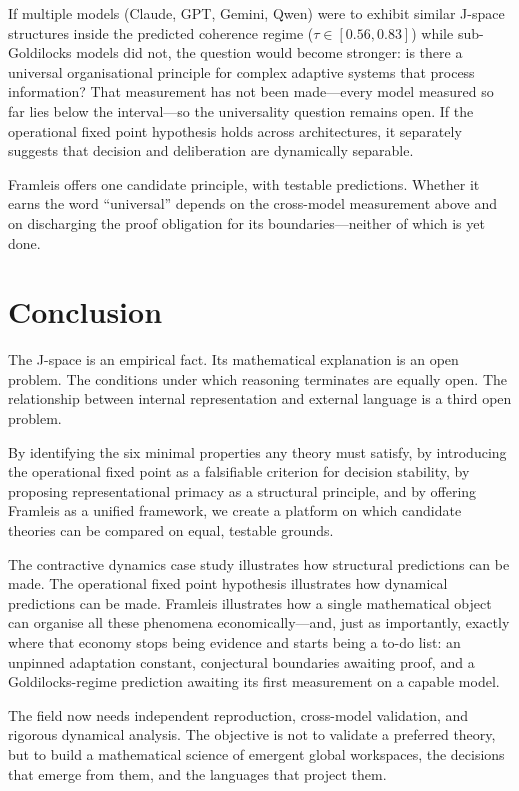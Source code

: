 \documentclass[11pt,a4paper]{article}
\theoremstyle{definition}
\begin{document}
If multiple models (Claude, GPT, Gemini, Qwen) were to exhibit similar J-space
structures inside the predicted coherence regime ($\tau \in [0.56, 0.83]$) while
sub-Goldilocks models did not, the question would become stronger: is there a
universal organisational principle for complex adaptive systems that process
information? That measurement has not been made---every model measured so far lies
below the interval---so the universality question remains open. If the operational
fixed point hypothesis holds across architectures, it separately suggests that
decision and deliberation are dynamically separable.

Framleis offers one candidate principle, with testable predictions. Whether it
earns the word ``universal'' depends on the cross-model measurement above and on
discharging the proof obligation for its boundaries---neither of which is yet done.

\section{Conclusion}
\label{sec:conclusion}

The J-space is an empirical fact. Its mathematical explanation is an open
problem. The conditions under which reasoning terminates are equally open.
The relationship between internal representation and external language is
a third open problem.

By identifying the six minimal properties any theory must satisfy, by introducing
the operational fixed point as a falsifiable criterion for decision stability,
by proposing representational primacy as a structural principle, and by offering
Framleis as a unified framework, we create a platform on which candidate theories
can be compared on equal, testable grounds.

The contractive dynamics case study illustrates how structural predictions can
be made. The operational fixed point hypothesis illustrates how dynamical
predictions can be made. Framleis illustrates how a single mathematical object
can organise all these phenomena economically---and, just as importantly, exactly
where that economy stops being evidence and starts being a to-do list: an unpinned
adaptation constant, conjectural boundaries awaiting proof, and a Goldilocks-regime
prediction awaiting its first measurement on a capable model.

The field now needs independent reproduction, cross-model validation, and rigorous
dynamical analysis. The objective is not to validate a preferred theory, but to
build a mathematical science of emergent global workspaces, the decisions that
emerge from them, and the languages that project them.
\end{document}
